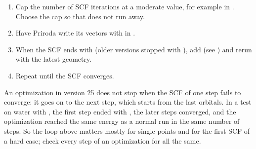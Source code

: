 \documentclass[letterpaper,10pt,english,openany,oneside]{sphinxmanual}
\begin{document}
\begin{enumerate}
%
\item {} 
\sphinxAtStartPar
Cap the number of SCF iterations at a moderate value, for example  in {\hyperref[\detokenize{reference/scf:group-scf}]{}}.
Choose the cap so that  does not run away.

\item {} 
\sphinxAtStartPar
Have Priroda write its vectors with {\hyperref[\detokenize{reference/control:control-save}]{}} in {\hyperref[\detokenize{reference/control:group-control}]{}}.

\item {} 
\sphinxAtStartPar
When the SCF ends with  (older versions stopped with ), add
 (see {\hyperref[\detokenize{reference/guess:guess-read}]{}}) and rerun with the latest geometry.

\item {} 
\sphinxAtStartPar
Repeat until the SCF converges.

\end{enumerate}

\begin{sphinxVerbatim}[commandchars=\\\{\}]
\end{sphinxVerbatim}



\sphinxAtStartPar
An optimization in version 25 does not stop when the SCF of one step fails to converge: it goes on to the next step,
which starts from the last orbitals. In a test on water with , the first step ended with
, the later steps converged, and the optimization reached the same energy as a normal run in the
same number of steps. So the loop above matters mostly for single points and for the first SCF of a hard case;
check every step of an optimization for  all the same. 
\end{document}
